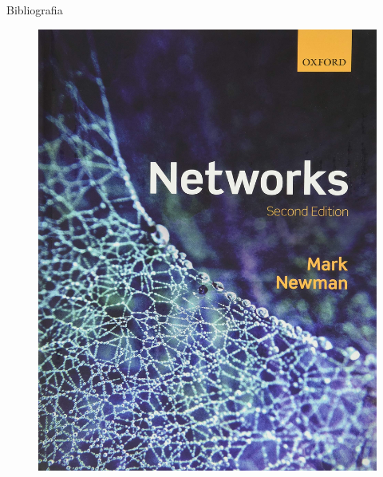 \documentclass[12pt,mathserif,aspectratio=169]{beamer}
\begin{document}
\begin{frame}{Bibliografia}
\begin{center}
\begin{minipage}{0.25\textwidth}
\begin{figure}
                \includegraphics[width=0.25\paperwidth]{fig/textbook2.jpg}
            \end{figure}
        \end{minipage}
        \hspace{0.5cm}
        \begin{minipage}{0.25\textwidth}
            \begin{figure}

\end{figure}
\end{minipage}
\end{center}
\end{frame}
\end{document}
